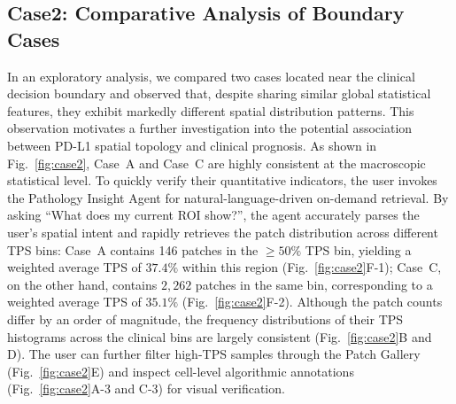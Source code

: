 \documentclass[journal]{vgtc}                     %
\begin{document}
\subsection{Case2: Comparative Analysis of Boundary Cases}

In an exploratory analysis, we compared two cases located near the clinical decision boundary and observed that, despite sharing similar global statistical features, they exhibit markedly different spatial distribution patterns. This observation motivates a further investigation into the potential association between PD-L1 spatial topology and clinical prognosis. As shown in Fig.~\ref{fig:case2}, Case~A and Case~C are highly consistent at the macroscopic statistical level. To quickly verify their quantitative indicators, the user invokes the Pathology Insight Agent for natural-language-driven on-demand retrieval. By asking ``What does my current ROI show?'', the agent accurately parses the user's spatial intent and rapidly retrieves the patch distribution across different TPS bins: Case~A contains 146 patches in the $\geq 50\%$ TPS bin, yielding a weighted average TPS of $37.4\%$ within this region (Fig.~\ref{fig:case2}F-1); Case~C, on the other hand, contains $2{,}262$ patches in the same bin, corresponding to a weighted average TPS of $35.1\%$ (Fig.~\ref{fig:case2}F-2). Although the patch counts differ by an order of magnitude, the frequency distributions of their TPS histograms across the clinical bins are largely consistent (Fig.~\ref{fig:case2}B and D). The user can further filter high-TPS samples through the Patch Gallery (Fig.~\ref{fig:case2}E) and inspect cell-level algorithmic annotations (Fig.~\ref{fig:case2}A-3 and C-3) for visual verification.
\end{document}
